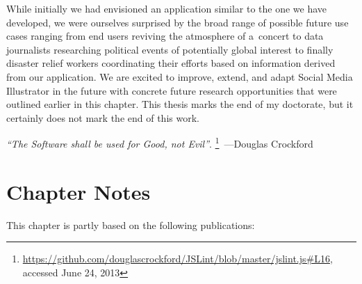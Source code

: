 While initially we had envisioned an application
similar to the one we have developed,
we were ourselves surprised by the broad range
of possible future use cases ranging from end users
reviving the atmosphere of a~concert
to data journalists researching political events
of potentially global interest
to finally disaster relief workers coordinating 
their efforts based on information derived from our application.
We are excited to improve, extend, and adapt
Social Media Illustrator in the future
with concrete future research opportunities
that were outlined earlier in this chapter.
This thesis marks the end of my doctorate,
but it certainly does not mark the end of this work.

\begin{flushright}
\textit{``The Software shall be used for Good, not Evil''}.%
\footnote{\url{https://github.com/douglascrockford/JSLint/blob/master/jslint.js\#L16},
accessed June 24, 2013}~---Douglas Crockford
\end{flushright}

\section*{Chapter Notes}
This chapter is partly based on the following publications:


